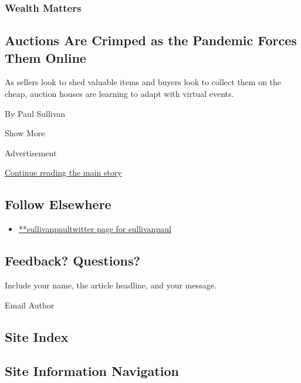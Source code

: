\begin{enumerate}
{  \subsubsection{Wealth Matters}\label{wealth-matters-5}}

  \hypertarget{auctions-are-crimped-as-the-pandemic-forces-them-online}{%
  \subsection{Auctions Are Crimped as the Pandemic Forces Them
  Online}\label{auctions-are-crimped-as-the-pandemic-forces-them-online}}

  As sellers look to shed valuable items and buyers look to collect them
  on the cheap, auction houses are learning to adapt with virtual
  events.

  By Paul Sullivan
\end{enumerate}

Show More

Advertisement

\protect\hyperlink{after-mid2}{Continue reading the main story}

\hypertarget{follow-elsewhere}{%
\subsection{Follow Elsewhere}\label{follow-elsewhere}}

\begin{itemize}
\tightlist
\item
  \href{https://twitter.com/sullivanpaul}{**sullivanpaultwitter page for
  sullivanpaul}
\end{itemize}

\hypertarget{feedback-questions}{%
\subsection{Feedback? Questions?}\label{feedback-questions}}

Include your name, the article headline, and your message.

Email Author

\hypertarget{site-index}{%
\subsection{Site Index}\label{site-index}}

\hypertarget{site-information-navigation}{%
\subsection{Site Information
Navigation}\label{site-information-navigation}}

